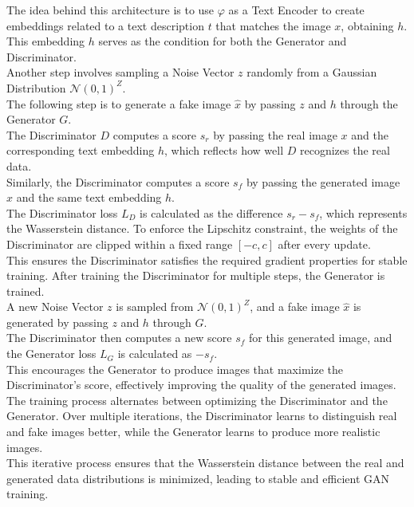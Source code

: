 The idea behind this architecture is to use $\varphi$ as a Text Encoder to create embeddings 
related to a text description $t$ that matches the image $x$, obtaining $h$. 
This embedding $h$ serves as the condition for both the Generator and Discriminator. \\
Another step involves sampling a Noise Vector $z$ randomly from 
a Gaussian Distribution $\mathcal{N}(0, 1)^Z$. \\
The following step is to generate a fake image $\hat{x}$ by passing $z$ 
and $h$ through the Generator $G$. \\
The Discriminator $D$ computes a score $s_r$ by passing the real image $x$ and 
the corresponding text embedding $h$, which reflects how well $D$ recognizes 
the real data. \\
Similarly, the Discriminator computes a score $s_f$ by passing 
the generated image $\hat{x}$ and the same text embedding $h$.\\
The Discriminator loss $L_D$ is calculated as the difference $s_r - s_f$, which represents 
the Wasserstein distance. To enforce the Lipschitz constraint, the weights of 
the Discriminator are clipped within a fixed range $[-c, c]$ after every update. \\
This ensures the Discriminator satisfies the required gradient properties for stable training.
After training the Discriminator for multiple steps, the Generator is trained. \\
A new Noise Vector $z$ is sampled from $\mathcal{N}(0, 1)^Z$, and a fake image $\hat{x}$ 
is generated by passing $z$ and $h$ through $G$. \\
The Discriminator then computes a new score $s_f$ for this generated image, 
and the Generator loss $L_G$ is calculated as $-s_f$. \\
This encourages the Generator to produce images that maximize the Discriminator's score, 
effectively improving the quality of the generated images. \\
The training process alternates between optimizing the Discriminator and the Generator. 
Over multiple iterations, the Discriminator learns to distinguish real and fake images better, 
while the Generator learns to produce more realistic images. \\
This iterative process ensures that the Wasserstein distance between the real and generated 
data distributions is minimized, leading to stable and efficient GAN training.



